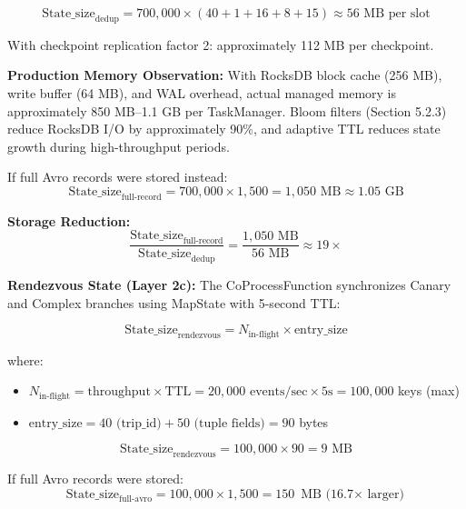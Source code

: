 \begin{equation}
\text{State\_size}_{\text{dedup}} = 700{,}000 \times (40 + 1 + 16 + 8 + 15) \approx 56 \text{ MB per slot}
\end{equation}

With checkpoint replication factor 2: approximately 112 MB per checkpoint.

\textbf{Production Memory Observation:} With RocksDB block cache (256 MB), write buffer (64 MB), and WAL overhead, actual managed memory is approximately 850 MB--1.1 GB per TaskManager. Bloom filters (Section 5.2.3) reduce RocksDB I/O by approximately 90\%, and adaptive TTL reduces state growth during high-throughput periods.

If full Avro records were stored instead:
\begin{equation}
\text{State\_size}_{\text{full-record}} = 700{,}000 \times 1{,}500 = 1{,}050 \text{ MB} \approx 1.05 \text{ GB}
\end{equation}

\textbf{Storage Reduction:}
\begin{equation}
\frac{\text{State\_size}_{\text{full-record}}}{\text{State\_size}_{\text{dedup}}} = \frac{1{,}050 \text{ MB}}{56 \text{ MB}} \approx 19\times
\end{equation}

\textbf{Rendezvous State (Layer 2c):} The CoProcessFunction synchronizes Canary and Complex branches using MapState with 5-second TTL:

\begin{equation}
\text{State\_size}_{\text{rendezvous}} = N_{\text{in-flight}} \times \text{entry\_size}
\end{equation}

where:
\begin{itemize}
    \item $N_{\text{in-flight}} = \text{throughput} \times \text{TTL} = 20{,}000 \text{ events/sec} \times 5\text{s} = 100{,}000$ keys (max)
    \item $\text{entry\_size} = 40 \text{ (trip\_id)} + 50 \text{ (tuple fields)} = 90$ bytes
\end{itemize}

\begin{equation}
\text{State\_size}_{\text{rendezvous}} = 100{,}000 \times 90 = 9 \text{ MB}
\end{equation}

If full Avro records were stored:
\begin{equation}
\text{State\_size}_{\text{full-avro}} = 100{,}000 \times 1{,}500 = 150 \text{ MB (16.7$\times$ larger)}
\end{equation}

